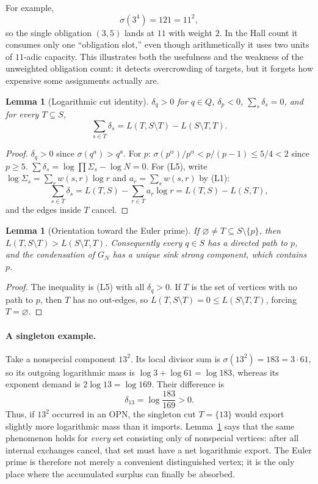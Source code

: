 \documentclass[11pt]{article}
\newtheorem{lemma}[theorem]{Lemma}
\theoremstyle{definition}
\theoremstyle{remark}
\begin{document}
For example,
\[
\sigma(3^4)=121=11^2,
\]
so the single obligation $(3,5)$ lands at $11$ with weight $2$.  In the Hall
count it consumes only one ``obligation slot,'' even though arithmetically it
uses two units of $11$-adic capacity.  This illustrates both the usefulness
and the weakness of the unweighted obligation count: it detects overcrowding
of targets, but it forgets how expensive some assignments actually are.

\begin{lemma}[Logarithmic cut identity]\label{lem:L5}
$\delta_q>0$ for $q\in Q$, $\delta_p<0$, $\sum_s\delta_s=0$, and for
every $T\subseteq S$,
\[
\sum_{s\in T}\delta_s=L(T,S\setminus T)-L(S\setminus T,T).\tag{L5}
\]
\end{lemma}

\begin{proof}
$\delta_q>0$ since $\sigma(q^a)>q^a$. For $p$:
$\sigma(p^\alpha)/p^\alpha<p/(p-1)\le 5/4<2$ since $p\ge5$.
$\sum\delta_s=\log\prod\Sigma_s-\log N=0$. For (L5), write
$\log\Sigma_s=\sum_r w(s,r)\log r$ and $a_r=\sum_s w(s,r)$ by (L1):
\[
\sum_{s\in T}\delta_s=L(T,S)-\sum_{r\in T}a_r\log r=L(T,S)-L(S,T),
\]
and the edges inside $T$ cancel.
\end{proof}

\begin{lemma}[Orientation toward the Euler prime]\label{lem:L6}
If $\varnothing\ne T\subseteq S\setminus\{p\}$, then
$L(T,S\setminus T)>L(S\setminus T,T)$. Consequently every $q\in S$ has a
directed path to $p$, and the condensation of $G_N$ has a unique sink
strong component, which contains $p$.
\end{lemma}

\begin{proof}
The inequality is (L5) with all $\delta_q>0$. If $T$ is the set of
vertices with no path to $p$, then $T$ has no out-edges, so
$L(T,S\setminus T)=0\le L(S\setminus T,T)$, forcing $T=\varnothing$.
\end{proof}

\paragraph{A singleton example.}
Take a nonspecial component $13^2$.  Its local divisor sum is
$\sigma(13^2)=183=3\cdot61$, so its outgoing logarithmic mass is
$\log 3+\log61=\log183$, whereas its exponent demand is
$2\log13=\log169$.  Their difference is
\[
\delta_{13}=\log\frac{183}{169}>0.
\]
Thus, if $13^2$ occurred in an OPN, the singleton cut $T=\{13\}$ would
export slightly more logarithmic mass than it imports.  Lemma~\ref{lem:L6}
says that the same phenomenon holds for \emph{every} set consisting only of
nonspecial vertices: after all internal exchanges cancel, that set must have
a net logarithmic export.  The Euler prime is therefore not merely a
convenient distinguished vertex; it is the only place where the accumulated
surplus can finally be absorbed.
\end{document}
